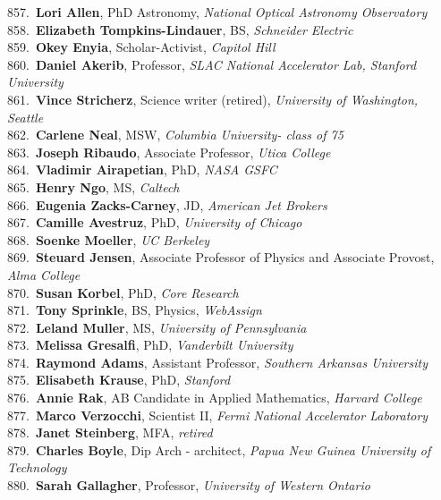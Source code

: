857.~{\bf Lori Allen}, PhD Astronomy, {\sl National Optical Astronomy Observatory} \\
858.~{\bf Elizabeth Tompkins-Lindauer}, BS, {\sl Schneider Electric} \\
859.~{\bf Okey Enyia}, Scholar-Activist, {\sl Capitol Hill} \\
860.~{\bf Daniel Akerib}, Professor, {\sl SLAC National Accelerator Lab, Stanford University } \\
861.~{\bf Vince Stricherz}, Science writer (retired), {\sl University of Washington, Seattle} \\
862.~{\bf Carlene Neal}, MSW, {\sl Columbia University- class of 75} \\
863.~{\bf Joseph Ribaudo}, Associate Professor, {\sl Utica College} \\
864.~{\bf Vladimir Airapetian}, PhD, {\sl NASA GSFC} \\
865.~{\bf Henry Ngo}, MS, {\sl Caltech} \\
866.~{\bf Eugenia Zacks-Carney}, JD, {\sl American Jet Brokers} \\
867.~{\bf Camille Avestruz}, PhD, {\sl University of Chicago} \\
868.~{\bf Soenke Moeller}, {\sl UC Berkeley} \\
869.~{\bf Steuard Jensen}, Associate Professor of Physics and Associate Provost, {\sl Alma College} \\
870.~{\bf Susan Korbel}, PhD, {\sl Core Research} \\
871.~{\bf Tony Sprinkle}, BS, Physics, {\sl WebAssign} \\
872.~{\bf Leland Muller}, MS, {\sl University of Pennsylvania } \\
873.~{\bf Melissa Gresalfi}, PhD, {\sl Vanderbilt University} \\
874.~{\bf Raymond Adams}, Assistant Professor, {\sl Southern Arkansas University } \\
875.~{\bf Elisabeth Krause}, PhD, {\sl Stanford} \\
876.~{\bf Annie Rak}, AB Candidate in Applied Mathematics, {\sl Harvard College} \\
877.~{\bf Marco Verzocchi}, Scientist II, {\sl Fermi National Accelerator Laboratory} \\
878.~{\bf Janet Steinberg}, MFA, {\sl retired} \\
879.~{\bf Charles Boyle}, Dip Arch - architect, {\sl Papua New Guinea University of Technology} \\
880.~{\bf Sarah Gallagher}, Professor, {\sl University of Western Ontario} \\
